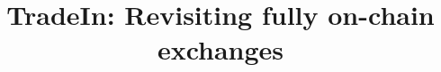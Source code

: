 \documentclass[envcountsect]{llncs}
\begin{document}
\frontmatter
\mainmatter

\title{\Large \bf TradeIn: Revisiting fully on-chain exchanges}
\author{}



\maketitle














\clearpage
\appendix
\end{document}

